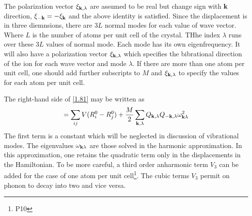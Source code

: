 The polarization vector $\xi_{\mathbf{k},\lambda}$ are assumed to be real but change sign with $\mathbf{k}$ direction, $\xi_{-\mathbf{k}} = -\xi_{\mathbf{k}}$ and the above identity is satisfied.
Since the displacement is in three diemnsions, there are $3L$ normal modes for each value of wave vector.
Where $L$ is the number of atoms per unit cell of the crystal.
THhe index $\lambda$ runs over these $3L$ values of normal mode.
Each mode has its own eigenfrequency.
It will also have a polarization vector $\xi_{\mathbf{k},\lambda}$ which specifies the bibrational direction of the ion for each wave vector and mode $\lambda$.
If there are more than one atom per unit cell, one should add further subscripts to $M$ and $\xi_{\mathbf{k},\lambda} $ to specify the values for each atom per unit cell.

The right-hand side of \eqref{1.81} may be written as
\begin{equation}
    = \sum_{ij} V(R^0_i - R^0_j) + \frac{M}{2} \sum_{\mathbf{k},\lambda} Q_{\mathbf{k},\lambda} Q_{-\mathbf{k},\lambda} \omega_{\mathbf{k}\lambda}^2    \label{1.87}
\end{equation}
The first term is a constant which will be neglected in discussion of vibrational modes.
The eigenvalues $\omega_{\mathbf{k}\lambda}$ are those solved in the harmonic approximation.
In this approximation, one retains the quadratic term only in the displacements in the Hamiltonian.
To be more careful, a third order anharmonic term $V_3$ can be added for the case of one atom per unit cell\footnote{P10}.
The cubic terms $V_3$ permit on phonon to decay into two and vice versa.

